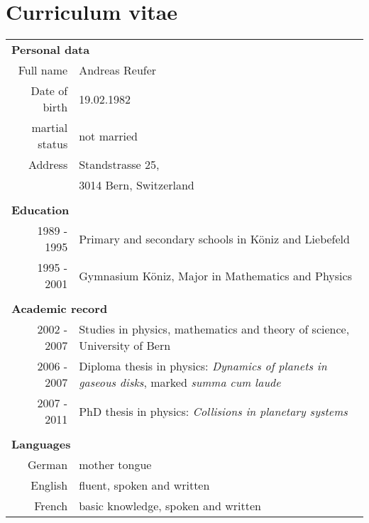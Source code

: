 

\cleardoublepage
\chapter*{Curriculum vitae}

\begin{tabular}{r p{12.0cm}}
\multicolumn{2}{l}{ {\large \bf Personal data} } \\
Full name & Andreas Reufer\\
Date of birth & 19.02.1982\\
martial status & not married \\
Address & Standstrasse 25, \\
 & 3014 Bern, Switzerland \\
\\
\multicolumn{2}{l}{ {\large \bf Education} } \\
1989 - 1995 & Primary and secondary schools in Köniz and Liebefeld\\
1995 - 2001 & Gymnasium Köniz, Major in Mathematics and Physics\\
\\
\multicolumn{2}{l}{ {\large \bf Academic record} } \\
2002 - 2007 & Studies in physics, mathematics and theory of science, University of Bern \\
2006 - 2007 & Diploma thesis in physics: \emph{Dynamics of planets in gaseous disks}, marked \emph{summa cum laude} \\
2007 - 2011 & PhD thesis in physics: \emph{Collisions in planetary systems} \\
\\
\multicolumn{2}{l}{ {\large \bf Languages} } \\
German & mother tongue\\
English & fluent, spoken and written\\
French & basic knowledge, spoken and written \\
\end{tabular}


